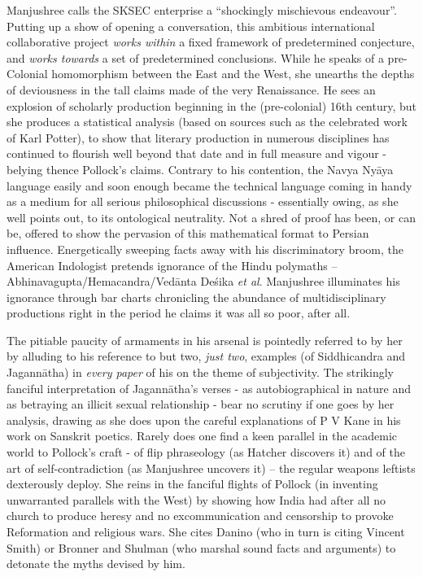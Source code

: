 Manjushree calls the SKSEC enterprise a “shockingly mischievous endeavour”. Putting up a show of opening a conversation, this ambitious international collaborative project {\sl works within} a fixed framework of predetermined conjecture, and {\sl works towards} a set of predetermined conclusions. While he speaks of a pre-Colonial homomorphism between the East and the West, she unearths the depths of deviousness in the tall claims made of the very Renaissance. He sees an explosion of scholarly production beginning in the (pre-colonial) 16th century, but she produces a statistical analysis (based on sources such as the celebrated work of Karl Potter), to show that literary production in numerous disciplines has continued to flourish well beyond that date and in full measure and vigour - belying thence Pollock's claims. Contrary to his contention, the Navya Nyāya language easily and soon enough became the technical language coming in handy as a medium for all serious philosophical discussions - essentially owing, as she well points out, to its ontological neutrality. Not a shred of proof has been, or can be, offered to show the pervasion of this mathematical format to Persian influence. Energetically sweeping facts away with his discriminatory broom, the American Indologist pretends ignorance of the Hindu polymaths -- Abhinavagupta/Hemacandra/Vedānta Deśika {\sl et al}. Manjushree illuminates his ignorance through bar charts chronicling the abundance of multidisciplinary productions right in the period he claims it was all so poor, after all.

The pitiable paucity of armaments in his arsenal is pointedly referred to by her by alluding to his reference to but two, {\sl just two}, examples (of Siddhicandra and Jagannātha) in {\sl every paper} of his on the theme of subjectivity. The strikingly fanciful interpretation of Jagannātha’s verses - as autobiographical in nature and as betraying an illicit sexual relationship - bear no scrutiny if one goes by her analysis, drawing as she does upon the careful explanations of P V Kane in his work on Sanskrit poetics. Rarely does one find a keen parallel in the academic world to Pollock’s craft - of flip phraseology (as Hatcher discovers it) and of the art of self-contradiction (as Manjushree uncovers it) -- the regular weapons leftists dexterously deploy. She reins in the fanciful flights of Pollock (in inventing unwarranted parallels with the West) by showing how India had after all no church to produce heresy and no excommunication and censorship to provoke Reformation and religious wars. She cites Danino (who in turn is citing Vincent Smith) or Bronner and Shulman (who marshal sound facts and arguments) to detonate the myths devised by him. 
\vskip 5pt

